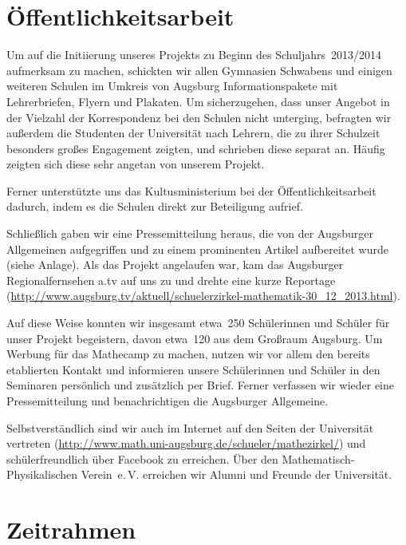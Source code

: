 \documentclass[12pt]{zettel}
\begin{document}
\section{Öffentlichkeitsarbeit}

Um auf die Initiierung unseres Projekts zu Beginn des Schuljahrs~2013/2014
aufmerksam zu machen, schickten wir allen Gymnasien Schwabens und einigen
weiteren Schulen im Umkreis von Augsburg Informationspakete mit Lehrerbriefen,
Flyern und Plakaten. Um sicherzugehen, dass unser Angebot in der
Vielzahl der Korrespondenz bei den Schulen nicht unterging, befragten wir außerdem
die Studenten der Universität nach Lehrern, die zu ihrer Schulzeit
besonders großes Engagement zeigten, und schrieben diese separat an.
Häufig zeigten sich diese sehr angetan von unserem Projekt.

Ferner unterstützte uns das Kultusministerium bei der Öffentlichkeitsarbeit
dadurch, indem es die Schulen direkt zur Beteiligung aufrief.

Schließlich gaben wir eine Pressemitteilung heraus, die von der
Augsburger Allgemeinen aufgegriffen und zu einem prominenten Artikel aufbereitet
wurde (siehe Anlage). Als das Projekt angelaufen war, kam das Augsburger
Regionalfernsehen a.tv auf uns zu und drehte eine kurze Reportage
(\href{http://www.augsburg.tv/aktuell/schuelerzirkel-mathematik-30_12_2013.html}{\textsf{http:/\!/www.augsburg.tv/aktuell/schuelerzirkel-mathematik-30\_{}12\_{}2013.html}}).

Auf diese Weise konnten wir insgesamt etwa~250 Schülerinnen und Schüler für
unser Projekt begeistern, davon etwa~120 aus dem Großraum Augsburg. Um Werbung für
das Mathecamp zu machen, nutzen wir vor allem den bereits etablierten Kontakt
und informieren unsere Schülerinnen und Schüler in den Seminaren persönlich und
zusätzlich per Brief. Ferner verfassen wir wieder eine Pressemitteilung und
benachrichtigen die Augsburger Allgemeine.

Selbstverständlich sind wir auch im Internet auf den Seiten der Universität
vertreten
(\href{http://www.math.uni-augsburg.de/schueler/mathezirkel/}{\textsf{http:/\!/www.math.uni-augsburg.de/schueler/mathezirkel/}})
und schülerfreundlich über Facebook zu erreichen. Über den
Mathematisch-Physikalischen Verein~e.\,V. erreichen wir Alumni und Freunde der
Universität.


\section{Zeitrahmen}
\end{document}

